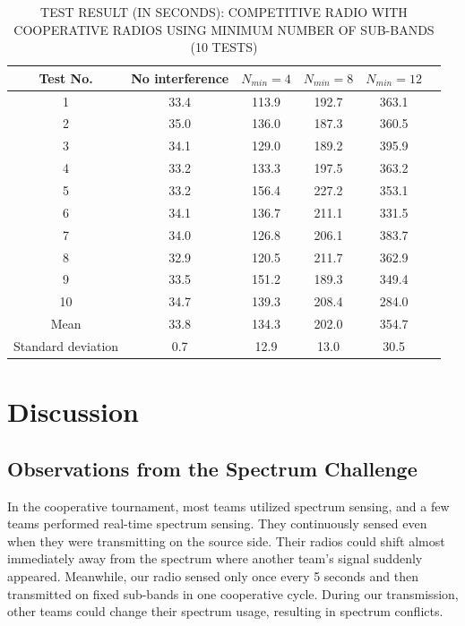 \begin{table}[tpb]
\centering
    \caption{TEST RESULT (IN SECONDS): COMPETITIVE RADIO WITH COOPERATIVE RADIOS USING MINIMUM NUMBER OF SUB-BANDS (10 TESTS) \label{tbl:COMPTestResultsStatic}}
    \begin{tabular}{cccccc} \toprule
      {Test No.}
      &{No interference}
      &{$N_{min}=4$}
      &{$N_{min}=8$}
      &{$N_{min}=12$}  \\ \bottomrule
1	                  &33.4	&113.9	&192.7	&363.1 \\ \hline
2	                  &35.0	&136.0	&187.3	&360.5 \\ \hline
3	                  &34.1	&129.0	&189.2	&395.9 \\ \hline
4	                  &33.2	&133.3	&197.5	&363.2 \\ \hline
5	                  &33.2	&156.4	&227.2	&353.1 \\ \hline
6	                  &34.1	&136.7	&211.1	&331.5 \\ \hline
7	                  &34.0	&126.8	&206.1	&383.7 \\ \hline
8	                  &32.9	&120.5	&211.7	&362.9 \\ \hline
9	                  &33.5	&151.2	&189.3	&349.4 \\ \hline
10	                  &34.7	&139.3	&208.4	&284.0 \\ \bottomrule
Mean	              &33.8	&134.3	&202.0	&354.7 \\ \hline
Standard deviation	  &0.7	&12.9	&13.0	&30.5  \\ \bottomrule
    \end{tabular}
\end{table}

\section{Discussion}
\subsection{Observations from the Spectrum Challenge}
In the cooperative tournament, most teams utilized spectrum sensing, and a few teams performed real-time spectrum sensing. They continuously sensed even when they were transmitting on the source side. Their radios could shift almost immediately away from the spectrum where another team's signal suddenly appeared. Meanwhile, our radio sensed only once every 5 seconds and then transmitted on fixed sub-bands in one cooperative cycle. During our transmission, other teams could change their spectrum usage, resulting in spectrum conflicts.

